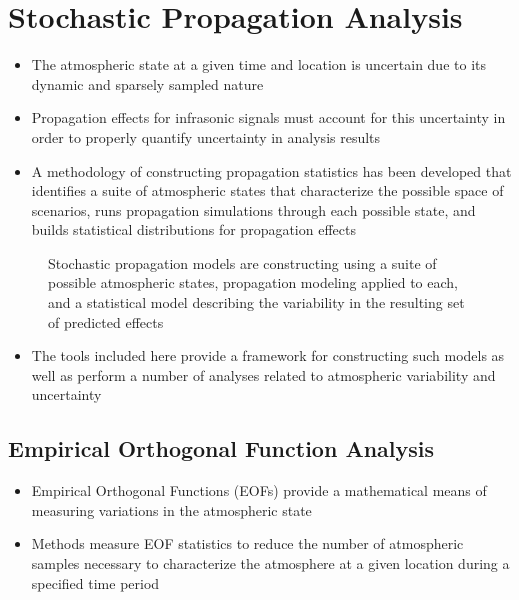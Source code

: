 \documentclass[letterpaper,10pt,english]{sphinxmanual}
\let\sphinxpxdimen\pdfpxdimen\else\newdimen\sphinxpxdimen
\begin{document}
\section{Stochastic Propagation Analysis}
\label{\detokenize{analysis:stochastic-propagation-analysis}}\label{\detokenize{analysis:analysis}}\label{\detokenize{analysis::doc}}\begin{itemize}
\item {} 
The atmospheric state at a given time and location is uncertain due to its dynamic and sparsely sampled nature

\item {} 
Propagation effects for infrasonic signals must account for this uncertainty in order to properly quantify uncertainty in analysis results

\item {} 
A methodology of constructing propagation statistics has been developed that identifies a suite of atmospheric states that characterize the possible space of scenarios, runs propagation simulations through each possible state, and builds statistical distributions for propagation effects

\end{itemize}

\begin{figure}[htbp]
\centering
\capstart

\noindent\sphinxincludegraphics[width=500\sphinxpxdimen]{{stochprop_fig1}.jpg}
\caption{Stochastic propagation models are constructing using a suite of possible atmospheric states, propagation modeling applied to each, and a statistical model describing the variability in the resulting set of predicted effects}\label{\detokenize{analysis:id1}}\end{figure}
\begin{itemize}
\item {} 
The tools included here provide a framework for constructing such models as well as perform a number of analyses related to atmospheric variability and uncertainty

\end{itemize}


\subsection{Empirical Orthogonal Function Analysis}
\label{\detokenize{analysis:eofs}}\begin{itemize}
\item {} 
Empirical Orthogonal Functions (EOFs) provide a mathematical means of measuring variations in the atmospheric state

\item {} 
Methods measure EOF statistics to reduce the number of atmospheric samples necessary to characterize the atmosphere at a given location during a specified time period

\end{itemize}
\end{document}
